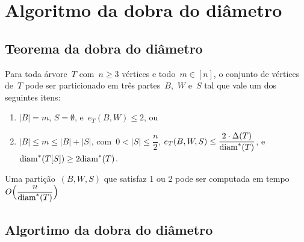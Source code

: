\section {Algoritmo da dobra do diâmetro}
	
	\subsection{Teorema da dobra do diâmetro}
	
		\begin{teo}
		\label{teo:dobraDiametro}
			Para toda árvore~$T$ com~$n\ge 3$ vértices e 
			todo~$m\in [n]$,
			o conjunto de vértices de~$T$ pode ser particionado em 
			três partes~$B$,~$W$ e~$S$ tal que vale um dos 
			seguintes itens:
			\begin{enumerate}
				\item ${|B|=m}$, ${S=\emptyset}$, e~${e_T(B,W)\le 2}$, ou
				\item ${|B|\le m\le |B|+|S|}$, 
				com~${0<|S|\le\dfrac{n}{2}}$,
				${e_T(B,W,S)\le \dfrac{2\cdot 
				\Delta(T)}{\mathrm{diam}^*(T)}}$, 
				e~${\mathrm{diam}^*(T[S])\ge 2\mathrm{diam}^*(T)}$.
			\end{enumerate}
			Uma partição~$(B,W,S)$ que satisfaz 1 ou 2 pode ser
			computada em tempo~${O\Big(\dfrac{n}{\mathrm{diam}^*(T)}\Big)}$ 
		\end{teo}

	\medskip
	\medskip


	\subsection{Algortimo da dobra do diâmetro}
	\begin{algorithm}[H]
	\label{alg:dobraDiametro}

		\caption{}
		\Output{}

	\end{algorithm}	
